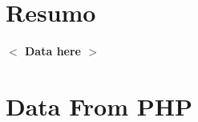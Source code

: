 \documentclass[12pt]{article}
\title{\vspace{-1in}\parbox{\linewidth}{\footnotesize\noindent{\sc \bf XI Summer Workshop in Mathematics - 2018 - Universidade de Bras\'ilia}} \break\indent{\sc \titulotrabalho{}}}
\date{}
\author{\sc \autortrabalho{}   \\ {\it email}
\\
{\small Universidade de Bras\'ilia }}
\newcommand{\placeholder}[1]{\textbf{$<$ #1 $>$}}
\newcommand{\abstractrabalho}{\placeholder{Data here}}
\begin{document}
\pagestyle{empty}
\maketitle

\section*{Resumo} 
\abstractrabalho{}

\thispagestyle{empty}

    \section{Data From PHP}
    

    

    
\end{document}
